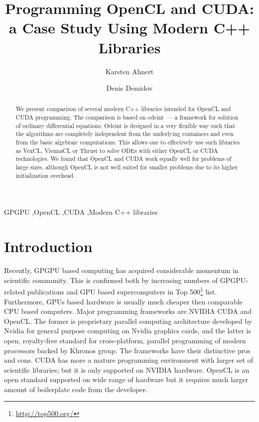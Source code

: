 \documentclass[1p]{elsarticle}
\begin{document}
\begin{frontmatter}

\title{Programming OpenCL and CUDA:\\a Case Study Using Modern C++ Libraries}

\author{Karsten Ahnert}
\address{
Institut f\"ur Physik und Astronomie, Universit\"at Potsdam,\\
Karl-Liebknecht-Strasse 24/25, 14476 Potsdam-Golm, Germany
}

\author{Denis Demidov}
\address{
Kazan Branch of Joint Supercomputer Center,
Russian Academy of Sciences,\\
Lobachevsky st. 2/31, 420008 Kazan, Russia
}

\begin{abstract}
    We present comparison of several modern C++ libraries intended for
    OpenCL and CUDA programming. The comparison is based on odeint~---
    a framework for solution of ordinary differential
    equations. Odeint is designed in a very flexible way such that the
    algorithms are completely independent from the underlying
    containers and even from the basic algebraic computations. This
    allows one to effectively use such libraries as VexCL, ViennaCL or
    Thrust to solve ODEs with either OpenCL or CUDA technologies. We
    found that OpenCL and CUDA work equally well for problems of large
    sizes, although OpenCL is not well suited for smaller problems due
    to its higher initialization overhead.
\end{abstract}

\begin{keyword}
    GPGPU \sep OpenCL \sep CUDA \sep Modern C++ libraries
\end{keyword}

\end{frontmatter}

\section{Introduction}

Recently, GPGPU based computing has acquired considerable momentum in
scientific community. This is confirmed both by increasing numbers of
GPGPU-related publications and GPU based supercomputers in Top
500\footnote{\href{http://top500.org/}{http://top500.org/}}
list. Furthermore, GPUs based hardware is usually much cheaper then
comparable CPU based computers. Major programming frameworks are
NVIDIA CUDA and OpenCL.  The former is proprietary parallel computing
architecture developed by Nvidia for general purpose computing on
Nvidia graphics cards, and the latter is open, royalty-free standard
for cross-platform, parallel programming of modern processors backed
by Khronos group. The frameworks have their distinctive pros and
cons. CUDA has more a mature programming environment with larger set of
scientific libraries; but it is only supported on NVIDIA
hardware. OpenCL is an open standard supported on wide range of
hardware but it requires much larger amount of boilerplate code from the
developer.
\end{document}

